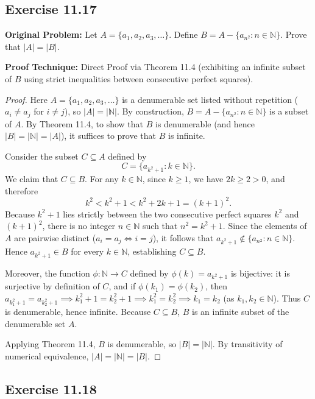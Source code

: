 \documentclass[11pt, letterpaper]{article}
\theoremstyle{definition}
\theoremstyle{remark}
\begin{document}
\subsection{Exercise 11.17}

\textbf{Original Problem:} Let $A = \{a_1, a_2, a_3, \dots\}$. Define $B = A - \{a_{n^2} : n \in \mathbb{N}\}$. Prove that $|A| = |B|$.

\textbf{Proof Technique:} Direct Proof via Theorem 11.4 (exhibiting an infinite subset of $B$ using strict inequalities between consecutive perfect squares).

\begin{proof}
Here $A = \{a_1, a_2, a_3, \dots\}$ is a denumerable set listed without repetition ($a_i \neq a_j$ for $i \neq j$), so $|A| = |\mathbb{N}|$. By construction, $B = A - \{a_{n^2} : n \in \mathbb{N}\}$ is a subset of $A$. By Theorem 11.4, to show that $B$ is denumerable (and hence $|B| = |\mathbb{N}| = |A|$), it suffices to prove that $B$ is infinite.

Consider the subset $C \subseteq A$ defined by
\[
C = \{a_{k^2 + 1} : k \in \mathbb{N}\}.
\]
We claim that $C \subseteq B$. For any $k \in \mathbb{N}$, since $k \ge 1$, we have $2k \ge 2 > 0$, and therefore
\[
k^2 < k^2 + 1 < k^2 + 2k + 1 = (k + 1)^2.
\]
Because $k^2 + 1$ lies strictly between the two consecutive perfect squares $k^2$ and $(k+1)^2$, there is no integer $n \in \mathbb{N}$ such that $n^2 = k^2 + 1$. Since the elements of $A$ are pairwise distinct ($a_i = a_j \iff i = j$), it follows that $a_{k^2 + 1} \notin \{a_{n^2} : n \in \mathbb{N}\}$. Hence $a_{k^2 + 1} \in B$ for every $k \in \mathbb{N}$, establishing $C \subseteq B$.

Moreover, the function $\phi : \mathbb{N} \to C$ defined by $\phi(k) = a_{k^2 + 1}$ is bijective: it is surjective by definition of $C$, and if $\phi(k_1) = \phi(k_2)$, then $a_{k_1^2 + 1} = a_{k_2^2 + 1} \implies k_1^2 + 1 = k_2^2 + 1 \implies k_1^2 = k_2^2 \implies k_1 = k_2$ (as $k_1, k_2 \in \mathbb{N}$). Thus $C$ is denumerable, hence infinite. Because $C \subseteq B$, $B$ is an infinite subset of the denumerable set $A$.

Applying Theorem 11.4, $B$ is denumerable, so $|B| = |\mathbb{N}|$. By transitivity of numerical equivalence, $|A| = |\mathbb{N}| = |B|$.
\end{proof}

\subsection{Exercise 11.18}
\end{document}
